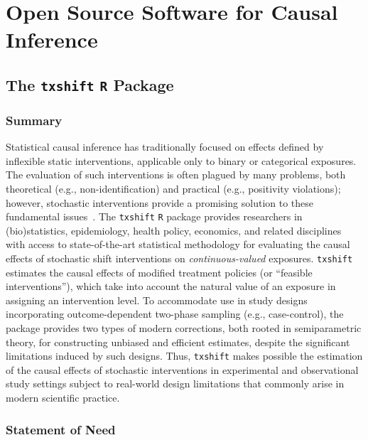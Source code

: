 \chapter{Open Source Software for Causal Inference}\label{five}

\section{The \texttt{txshift} \texttt{R} Package}

\subsection{Summary}

Statistical causal inference has traditionally focused on effects defined by
inflexible static interventions, applicable only to binary or categorical
exposures. The evaluation of such interventions is often plagued by many
problems, both theoretical (e.g., non-identification) and practical (e.g.,
positivity violations); however, stochastic interventions provide a promising
solution to these fundamental issues~\citep{diaz2018stochastic}. The
\texttt{txshift} \texttt{R} package provides researchers in (bio)statistics,
epidemiology, health policy, economics, and related disciplines with access to
state-of-the-art statistical methodology for evaluating the causal effects of
stochastic shift interventions on \textit{continuous-valued} exposures.
\texttt{txshift} estimates the causal effects of modified treatment policies (or
``feasible interventions''), which take into account the natural value of an
exposure in assigning an intervention level. To accommodate use in study designs
incorporating outcome-dependent two-phase sampling (e.g., case-control), the
package provides two types of modern corrections, both rooted in semiparametric
theory, for constructing unbiased and efficient estimates, despite the
significant limitations induced by such designs. Thus, \texttt{txshift} makes
possible the estimation of the causal effects of stochastic interventions in
experimental and observational study settings subject to real-world design
limitations that commonly arise in modern scientific practice.

\subsection{Statement of Need}

